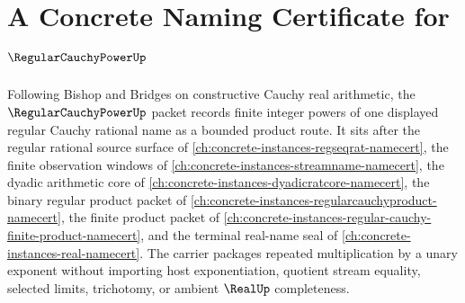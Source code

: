 \chapter{A Concrete Naming Certificate for $\RegularCauchyPowerUp$}
\label{ch:concrete-instances-regular-cauchy-power-namecert}

Following Bishop and Bridges on constructive Cauchy real arithmetic, the $\RegularCauchyPowerUp$ packet records finite integer powers of one displayed regular Cauchy rational name as a bounded product route. It sits after the regular rational source surface of \autoref{ch:concrete-instances-regseqrat-namecert}, the finite observation windows of \autoref{ch:concrete-instances-streamname-namecert}, the dyadic arithmetic core of \autoref{ch:concrete-instances-dyadicratcore-namecert}, the binary regular product packet of \autoref{ch:concrete-instances-regularcauchyproduct-namecert}, the finite product packet of \autoref{ch:concrete-instances-regular-cauchy-finite-product-namecert}, and the terminal real-name seal of \autoref{ch:concrete-instances-real-namecert}. The carrier packages repeated multiplication by a unary exponent without importing host exponentiation, quotient stream equality, selected limits, trichotomy, or ambient $\RealUp$ completeness.

